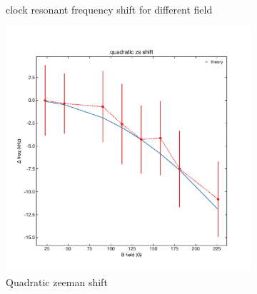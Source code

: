 \begin{figure}
\begin{subfigure}{0.4\linewidth}
		    \caption{clock resonant frequency shift for different field}
		\end{subfigure}
		\begin{subfigure}{0.4\linewidth}
		    \includegraphics[scale=0.4]{figures/quadratic_zeeman_shift.pdf}
		    \caption{Quadratic zeeman shift}
		\end{subfigure}
		\caption{}
		\end{figure}




